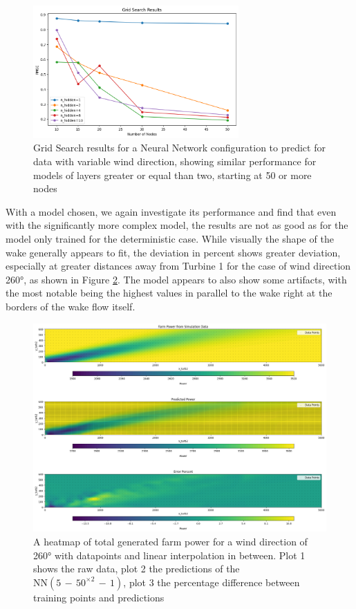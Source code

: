 \begin{figure}[h] 
	\centering
	\includegraphics[width=0.7\textwidth]{figures/optimization/prob_nn_opti.png} 
	\caption{Grid Search results for a Neural Network configuration to predict for data with variable wind direction, showing similar performance for models of layers greater or equal than two, starting at 50 or more nodes}
	\label{fig:determ_nn_opti}
\end{figure}


With a model chosen, we again investigate its performance and find that even with the significantly more complex model, the results are not as good as for the model only trained for the deterministic case. While visually the shape of the wake generally appears to fit, the deviation in percent shows greater deviation, especially at greater distances away from Turbine 1 for the case of wind direction 260°, as shown in Figure \ref{fig:prob_model_colormap}. The model appears to also show some artifacts, with the most notable being the highest values in parallel to the wake right at the borders of the wake flow itself.

\begin{figure}[h] 
	\centering
	\includegraphics[width=1\textwidth]{figures/optimization/prob_model_colormap.png} 
	\caption{A heatmap of total generated farm power for a wind direction of 260° with datapoints and linear interpolation in between. Plot 1 shows the raw data, plot 2 the predictions of the $\text{NN}(5\,{-}\,50^{\times2}\,{-}\,1)$, plot 3 the percentage difference between training points and predictions}
	\label{fig:prob_model_colormap}
\end{figure}

